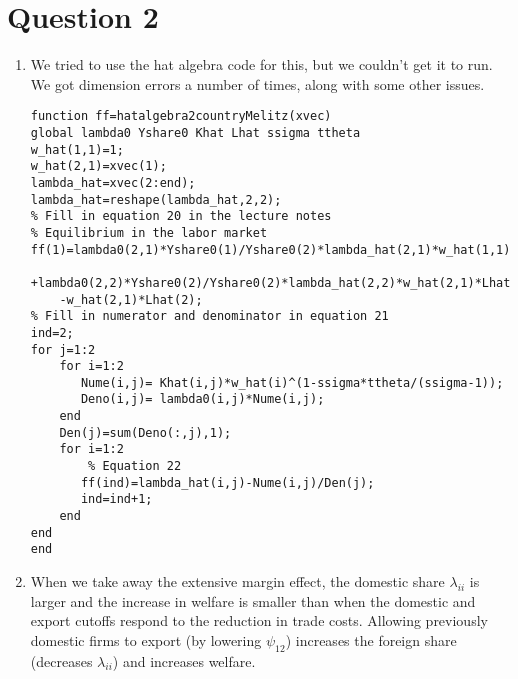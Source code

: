 \section{Question 2}
\begin{enumerate}
\item We tried to use the hat algebra code for this, but we couldn't get it to run. We got dimension errors a number of times, along with some other issues.
  \begin{verbatim}
function ff=hatalgebra2countryMelitz(xvec)
global lambda0 Yshare0 Khat Lhat ssigma ttheta
w_hat(1,1)=1;
w_hat(2,1)=xvec(1);
lambda_hat=xvec(2:end);
lambda_hat=reshape(lambda_hat,2,2);
% Fill in equation 20 in the lecture notes
% Equilibrium in the labor market
ff(1)=lambda0(2,1)*Yshare0(1)/Yshare0(2)*lambda_hat(2,1)*w_hat(1,1)*Lhat(1)...
    +lambda0(2,2)*Yshare0(2)/Yshare0(2)*lambda_hat(2,2)*w_hat(2,1)*Lhat(2)...
    -w_hat(2,1)*Lhat(2);
% Fill in numerator and denominator in equation 21
ind=2;
for j=1:2
    for i=1:2
       Nume(i,j)= Khat(i,j)*w_hat(i)^(1-ssigma*ttheta/(ssigma-1));
       Deno(i,j)= lambda0(i,j)*Nume(i,j);
    end
    Den(j)=sum(Deno(:,j),1);
    for i=1:2
        % Equation 22
       ff(ind)=lambda_hat(i,j)-Nume(i,j)/Den(j);
       ind=ind+1;
    end
end
end
  \end{verbatim}
  \item When we take away the extensive margin effect, the domestic share $\lambda_{ii}$ is larger and the increase in welfare is smaller than when the domestic and export cutoffs respond to the reduction in trade costs. Allowing previously domestic firms to export (by lowering $\psi_{12}$) increases the foreign share (decreases $\lambda_{ii}$) and increases welfare.
\end{enumerate}

